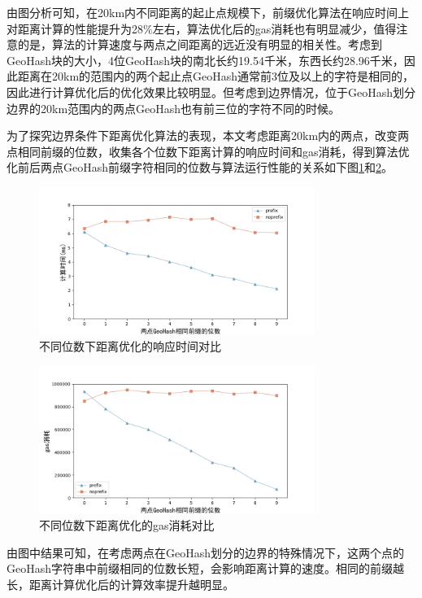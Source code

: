 由图分析可知，在20km内不同距离的起止点规模下，前缀优化算法在响应时间上对距离计算的性能提升为28$\%$左右，算法优化后的gas消耗也有明显减少，值得注意的是，算法的计算速度与两点之间距离的远近没有明显的相关性。考虑到GeoHash块的大小，4位GeoHash块的南北长约19.54千米，东西长约28.96千米，因此距离在20km的范围内的两个起止点GeoHash通常前3位及以上的字符是相同的，因此进行计算优化后的优化效果比较明显。但考虑到边界情况，位于GeoHash划分边界的20km范围内的两点GeoHash也有前三位的字符不同的时候。

为了探究边界条件下距离优化算法的表现，本文考虑距离20km内的两点，改变两点相同前缀的位数，收集各个位数下距离计算的响应时间和gas消耗，得到算法优化前后两点GeoHash前缀字符相同的位数与算法运行性能的关系如下图\ref{fig:diffBetterTime}和\ref{fig:diffBetterGas}。

\begin{figure}[h]
  \centering
  \includegraphics[height=0.3\textheight,width=0.8\textwidth]{figures/不同位数优化时间}
  \caption{不同位数下距离优化的响应时间对比}\label{fig:diffBetterTime}
\end{figure}

\begin{figure}[h]
  \centering
  \includegraphics[height=0.3\textheight,width=0.8\textwidth]{figures/不同位数优化gas}
  \caption{不同位数下距离优化的gas消耗对比}\label{fig:diffBetterGas}
\end{figure}

由图中结果可知，在考虑两点在GeoHash划分的边界的特殊情况下，这两个点的GeoHash字符串中前缀相同的位数长短，会影响距离计算的速度。相同的前缀越长，距离计算优化后的计算效率提升越明显。


